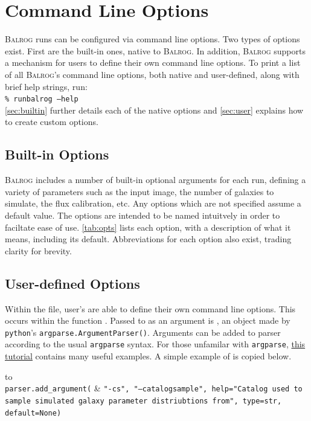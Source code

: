\documentclass[12pt]{book}
\newcommand{\balrog}{\textsc{Balrog}}
\newcommand{\opt}[1]{\texttt{--#1}}
\newcommand{\inline}{\\[0.4cm]}
\newcommand{\bcmd}[1]{\texttt{\% runbalrog #1}}
\begin{document}
\chapter{Command Line Options}
\label{sec:cmdline}

\balrog{} runs can be configured via command line options.
Two types of options exist. First are the built-in
ones, native to \balrog{}. In addition, \balrog{}
supports a mechanism for users to define their
own command line options.
To print a list of all \balrog{}'s command line options,
both native and user-defined, along with
brief help strings, run:
\inline
\bcmd{\opt{help}}
\inline
\autoref{sec:builtin} further details each
of the native options and \autoref{sec:user}
explains how to create custom options.

\section{Built-in Options}
\label{sec:builtin}

\balrog{} includes a number of built-in optional arguments for each run, defining a
variety of parameters such as the input image,
the number of galaxies to simulate, the flux calibration, etc.
Any options which are not specified assume a default value.
The options are intended to be named intuitvely in order
to faciltate ease of use. 
\autoref{tab:opts} lists each option, with a description of 
what it means, including its default.
Abbreviations for each option also exist,
trading clarity for brevity.


\optstab{}

\section{User-defined Options}
\label{sec:user}

Within the \config{} file, user's are able to
define their own command line options. This occurs
within the function \argsfunc{}. Passed
to \argsfunc{}  as an argument is \argsparser{},
an object made by \texttt{python}'s
\texttt{argparse.ArgumentParser()}. Arguments
can be added to parser according to the usual
\texttt{argparse} syntax.
For those unfamilar with \texttt{argparse},
\href{http://docs.python.org/2/howto/argparse.html}{this tutorial}
contains many useful examples. A simple example of
\argsfunc{} is copied below.

\setlength{\tabcolsep}{0pt}
\begin{longtabu*} to \linewidth {l X}
\\
\hspace{20pt} \texttt{parser.add\_argument(} & \texttt{"-cs", "--catalogsample", help="Catalog used to
sample simulated galaxy parameter distriubtions from", type=str, default=None)}
\end{longtabu*}
\setlength{\tabcolsep}{6pt}
\addtocounter{table}{-1}
\end{document}
